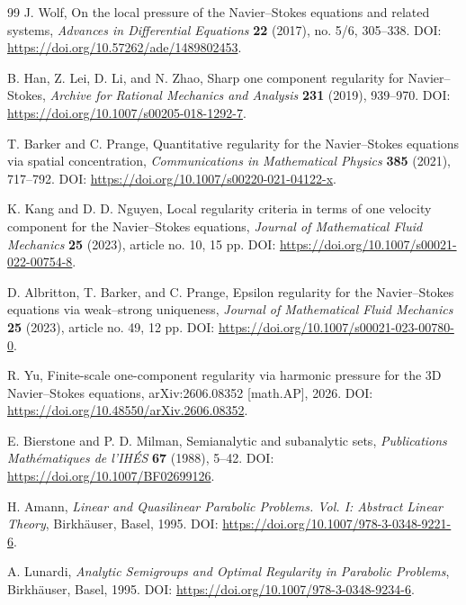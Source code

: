 \documentclass[11pt]{article}
\numberwithin{equation}{section}
\theoremstyle{plain}
\theoremstyle{definition}
\theoremstyle{remark}
\begin{document}
\begin{thebibliography}{99}
	J. Wolf,
	On the local pressure of the Navier--Stokes equations and related systems,
	\newblock \emph{Advances in Differential Equations} \textbf{22} (2017), no. 5/6, 305--338.
	\newblock DOI: \url{https://doi.org/10.57262/ade/1489802453}.

	B. Han, Z. Lei, D. Li, and N. Zhao,
	Sharp one component regularity for Navier--Stokes,
	\newblock \emph{Archive for Rational Mechanics and Analysis} \textbf{231} (2019), 939--970.
	\newblock DOI: \url{https://doi.org/10.1007/s00205-018-1292-7}.

	T. Barker and C. Prange,
	Quantitative regularity for the Navier--Stokes equations via spatial concentration,
	\newblock \emph{Communications in Mathematical Physics} \textbf{385} (2021), 717--792.
	\newblock DOI: \url{https://doi.org/10.1007/s00220-021-04122-x}.

	K. Kang and D. D. Nguyen,
	Local regularity criteria in terms of one velocity component for the Navier--Stokes equations,
	\newblock \emph{Journal of Mathematical Fluid Mechanics} \textbf{25} (2023), article no. 10, 15 pp.
	\newblock DOI: \url{https://doi.org/10.1007/s00021-022-00754-8}.

	D. Albritton, T. Barker, and C. Prange,
	Epsilon regularity for the Navier--Stokes equations via weak--strong uniqueness,
	\newblock \emph{Journal of Mathematical Fluid Mechanics} \textbf{25} (2023), article no. 49, 12 pp.
	\newblock DOI: \url{https://doi.org/10.1007/s00021-023-00780-0}.

	R. Yu,
	Finite-scale one-component regularity via harmonic pressure for the 3D Navier--Stokes equations,
	\newblock arXiv:2606.08352 [math.AP], 2026.
	\newblock DOI: \url{https://doi.org/10.48550/arXiv.2606.08352}.


E. Bierstone and P. D. Milman,
Semianalytic and subanalytic sets,
\emph{Publications Math\'ematiques de l'IH\'ES} \textbf{67} (1988), 5--42.
DOI: \url{https://doi.org/10.1007/BF02699126}.

H. Amann,
\emph{Linear and Quasilinear Parabolic Problems. Vol. I: Abstract Linear Theory},
Birkh\"auser, Basel, 1995.
DOI: \url{https://doi.org/10.1007/978-3-0348-9221-6}.

A. Lunardi,
\emph{Analytic Semigroups and Optimal Regularity in Parabolic Problems},
Birkh\"auser, Basel, 1995.
DOI: \url{https://doi.org/10.1007/978-3-0348-9234-6}.



\end{thebibliography}
\end{document}

